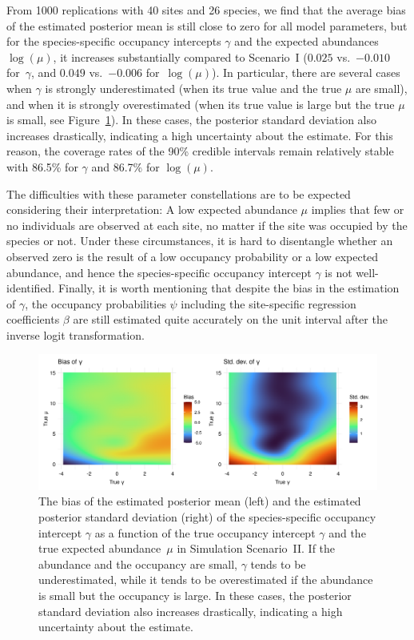 \documentclass{article}
\begin{document}
From 1000 replications with 40 sites and 26 species, we find that the average bias of the estimated posterior mean is still close to zero for all model parameters, but for the species-specific occupancy intercepts $\gamma$ and the expected abundances $\log(\mu)$, it increases substantially compared to Scenario~I ($0.025$ vs.~$-0.010$ for~$\gamma$, and $0.049$ vs.~$-0.006$ for~$\log(\mu)$). In particular, there are several cases when $\gamma$ is strongly underestimated (when its true value and the true $\mu$ are small), and when it is strongly overestimated (when its true value is large but the true $\mu$ is small, see Figure~\ref{fig:sim-2-gamma}). In these cases, the posterior standard deviation also increases drastically, indicating a high uncertainty about the estimate. For this reason, the coverage rates of the 90\% credible intervals remain relatively stable with 86.5\% for $\gamma$ and 86.7\% for $\log(\mu)$.

The difficulties with these parameter constellations are to be expected considering their interpretation: A low expected abundance $\mu$ implies that few or no individuals are observed at each site, no matter if the site was occupied by the species or not. Under these circumstances, it is hard to disentangle whether an observed zero is the result of a low occupancy probability or a low expected abundance, and hence the species-specific occupancy intercept $\gamma$ is not well-identified. Finally, it is worth mentioning that despite the bias in the estimation of $\gamma$, the occupancy probabilities $\psi$ including the site-specific regression coefficients $\beta$ are still estimated quite accurately on the unit interval after the inverse logit transformation.

\begin{figure}
\centering
\includegraphics[width=\linewidth]{figures/sim-2-gamma}
\caption{The bias of the estimated posterior mean (left) and the estimated posterior standard deviation (right) of the species-specific occupancy intercept $\gamma$ as a function of the true occupancy intercept $\gamma$ and the true expected abundance~$\mu$ in Simulation Scenario~II. If the abundance and the occupancy are small, $\gamma$ tends to be underestimated, while it tends to be overestimated if the abundance is small but the occupancy is large. In these cases, the posterior standard deviation also increases drastically, indicating a high uncertainty about the estimate.}
\label{fig:sim-2-gamma}
\end{figure}
\end{document}
